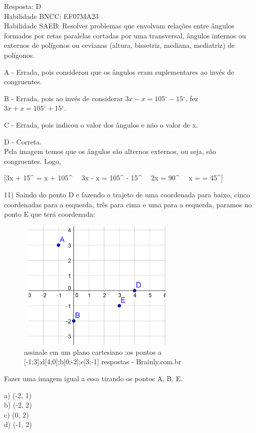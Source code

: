 Resposta: D\\
Habilidade BNCC: EF07MA23\\
Habilidade SAEB: Resolver problemas que envolvam relações entre ângulos
formados por retas paralelas cortadas por uma transversal, ângulos
internos ou externos de polígonos ou cevianas (altura, bissetriz,
mediana, mediatriz) de polígonos.

A - Errada, pois considerou que os ângulos eram suplementares ao invés
de congruentes.

B - Errada, pois ao invés de considerar
\(3x - x = 105{^\circ} - 15{^\circ}\), fez
\(3x + x = 105{^\circ} + 15{^\circ}\).

C - Errada, pois indicou o valor dos ângulos e não o valor de x.

D - Correta.\\
Pela imagem temos que os ângulos são alternos externos, ou seja, são
congruentes. Logo,

[3x + 15{^\circ} = x + 105{^\circ} \rightarrow \ \ 3x - x = 105{^\circ} - 15{^\circ} \rightarrow \ \ 2x = 90{^\circ} \rightarrow \ \ x =  = 45{^\circ}]

11) Saindo do ponto D e fazendo o trajeto de uma coordenada para baixo,
cinco coordenadas para a esquerda, três para cima e uma para a esquerda,
paramos no ponto E que terá coordenada:

\begin{figure}
\centering
\includegraphics[width=3.0483in,height=2.48457in]{./imgSAEB_7_MAT/media/image61.png}
\caption{assinale em um plano cartesiano ;os pontos a
{[}-1;3{]};d{[}4;0{]};b{[}0;-2{]};e{[}3;-1{]} respostas -
Brainly.com.br}
\end{figure}

Fazer uma imagem igual a essa tirando os pontos A, B, E.

a) (-2, 1)\\
b) (-2, 2)\\
c) (0, 2)\\
d) (-1, 2)

